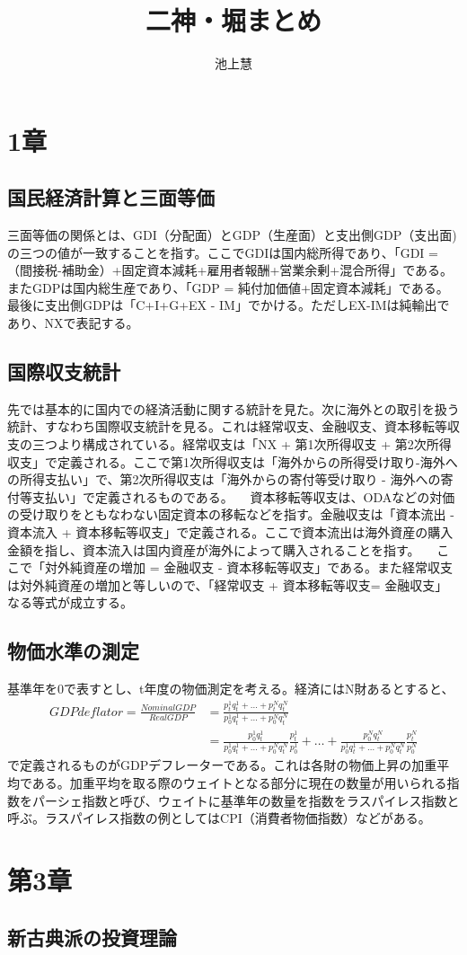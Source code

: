 \documentclass{jsarticle}
\begin{document}
\title{二神・堀まとめ}
\author{池上慧}
\maketitle

\section{1章}
\subsection{国民経済計算と三面等価}
三面等価の関係とは、GDI（分配面）とGDP（生産面）と支出側GDP（支出面)の三つの値が一致することを指す。ここでGDIは国内総所得であり、「GDI = （間接税-補助金）+固定資本減耗+雇用者報酬+営業余剰+混合所得」である。またGDPは国内総生産であり、「GDP = 純付加価値+固定資本減耗」である。最後に支出側GDPは「C+I+G+EX - IM」でかける。ただしEX-IMは純輸出であり、NXで表記する。

\subsection{国際収支統計}
先では基本的に国内での経済活動に関する統計を見た。次に海外との取引を扱う統計、すなわち国際収支統計を見る。これは経常収支、金融収支、資本移転等収支の三つより構成されている。経常収支は「NX + 第1次所得収支 + 第2次所得収支」で定義される。ここで第1次所得収支は「海外からの所得受け取り-海外への所得支払い」で、第2次所得収支は「海外からの寄付等受け取り - 海外への寄付等支払い」で定義されるものである。
　資本移転等収支は、ODAなどの対価の受け取りをともなわない固定資本の移転などを指す。金融収支は「資本流出 - 資本流入 + 資本移転等収支」で定義される。ここで資本流出は海外資産の購入金額を指し、資本流入は国内資産が海外によって購入されることを指す。
　ここで「対外純資産の増加 = 金融収支 - 資本移転等収支」である。また経常収支は対外純資産の増加と等しいので、「経常収支 + 資本移転等収支= 金融収支」なる等式が成立する。

\subsection{物価水準の測定}
基準年を0で表すとし、t年度の物価測定を考える。経済にはN財あるとすると、
\begin{align*}
	GDPdeflator = \frac{Nominal GDP}{Real GDP} &= \frac{p_t^1 q_t^1 + \dots + p_t^N q_t^N}{p_0^1q_t^1 + \dots + p_0^Nq_t^N}\\
	&= \frac{p_0^1q_t^1}{p_0^1q_t^1 + \dots + p_0^Nq_t^N}\frac{p_t^1}{p_0^1} + \dots + \frac{p_0^Nq_t^N}{p_0^1q_t^1 + \dots + p_0^Nq_t^N}\frac{p_t^N}{p_0^N}
\end{align*}
で定義されるものがGDPデフレーターである。これは各財の物価上昇の加重平均である。加重平均を取る際のウェイトとなる部分に現在の数量が用いられる指数をパーシェ指数と呼び、ウェイトに基準年の数量を指数をラスパイレス指数と呼ぶ。ラスパイレス指数の例としてはCPI（消費者物価指数）などがある。

\section{第3章}
\subsection{新古典派の投資理論}
\end{document}

